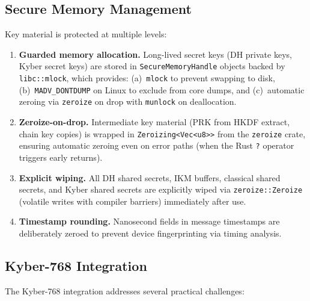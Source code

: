 \documentclass[11pt,a4paper]{article}
\theoremstyle{definition}
\begin{document}
\subsection{Secure Memory Management}

Key material is protected at multiple levels:

\begin{enumerate}
  \item \textbf{Guarded memory allocation.} Long-lived secret keys (DH private keys, Kyber secret keys) are stored in \texttt{SecureMemoryHandle} objects backed by \texttt{libc::mlock}, which provides: (a)~\texttt{mlock} to prevent swapping to disk, (b)~\texttt{MADV\_DONTDUMP} on Linux to exclude from core dumps, and (c)~automatic zeroing via \texttt{zeroize} on drop with \texttt{munlock} on deallocation.

  \item \textbf{Zeroize-on-drop.} Intermediate key material (PRK from HKDF extract, chain key copies) is wrapped in \texttt{Zeroizing<Vec<u8>>} from the \texttt{zeroize} crate, ensuring automatic zeroing even on error paths (when the Rust \texttt{?} operator triggers early returns).

  \item \textbf{Explicit wiping.} All DH shared secrets, IKM buffers, classical shared secrets, and Kyber shared secrets are explicitly wiped via \texttt{zeroize::Zeroize} (volatile writes with compiler barriers) immediately after use.

  \item \textbf{Timestamp rounding.} Nanosecond fields in message timestamps are deliberately zeroed to prevent device fingerprinting via timing analysis.
\end{enumerate}

\subsection{Kyber-768 Integration}\label{sec:kyber-impl}

The Kyber-768 integration addresses several practical challenges:
\end{document}
